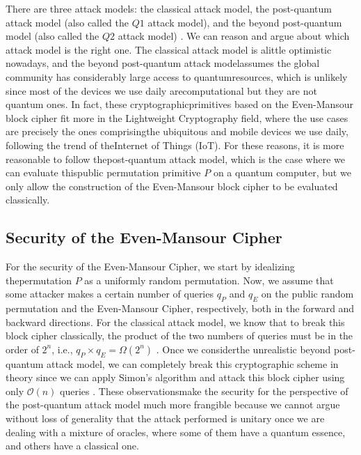 \documentclass[12pt]{article}
\begin{document}
    There are three attack models: the classical attack model, the post-quantum attack model (also called the $Q1$ attack model), and the beyond post-quantum model (also called the $Q2$ attack model) \cite{kaplan-leurent-leverrier-naya-plasencia:breaking-symmetric-cryptosystems-using-quantum-period-finding:2016:03-2024,zhandry:how-construct-quantum-random-functions:2021:03-2024}. We can reason and argue about which attack model is the right one. The classical attack model is a\break little optimistic nowadays, and the beyond post-quantum attack model\break assumes the global community has considerably large access to quantum\break resources, which is unlikely since most of the devices we use daily are\break computational but they are not quantum ones. In fact, these cryptographic\break primitives based on the Even-Mansour block cipher fit more in the Lightweight Cryptography field, where the use cases are precisely the ones comprising\break the ubiquitous and mobile devices we use daily, following the trend of the\break Internet of Things (IoT). For these reasons, it is more reasonable to follow the\break post-quantum attack model, which is the case where we can evaluate this\break public permutation primitive $P$ on a quantum computer, but we only allow the construction of the Even-Mansour block cipher to be evaluated classically.

    
    \subsection{Security of the Even-Mansour Cipher}
    \label{subsec:security-even-mansour-cipher}

    For the security of the Even-Mansour Cipher, we start by idealizing the\break permutation $P$ as a uniformly random permutation. Now, we assume that some attacker makes a certain number of queries ${q}_{P}$ and ${q}_{E}$ on the public random permutation and the Even-Mansour Cipher, respectively, both in the forward and backward directions. For the classical attack model, we know that to break this block cipher classically, the product of the two numbers of queries must be in the order of ${2}^{n}$, i.e., ${q}_{P} \times {q}_{E} = \Omega({2}^{n})$ \cite{even-mansour:construction-cipher-single-pseudorandom-permutation:1997:03-2024}. Once we consider\break the unrealistic beyond post-quantum attack model, we can completely break this cryptographic scheme in theory since we can apply Simon's algorithm \cite{simon:power-quantum-computation:1997:03-2024} and attack this block cipher using only $\mathcal{O}(n)$ queries \cite{kuwakado-morii:security-quantum-type-even-mansour-cipher:2012:03-2024}. These observations\break make the security for the perspective of the post-quantum attack model much more frangible because we cannot argue without loss of generality that the attack performed is unitary once we are dealing with a mixture of oracles, where some of them have a quantum essence, and others have a classical one.
\end{document}
